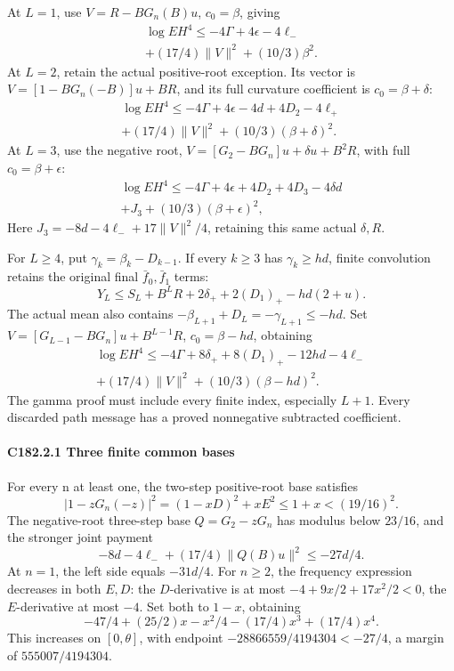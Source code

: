 At \(L=1\), use \(V=R-BG_n(B)u\), \(c_0=\beta\), giving
\[
\begin{gathered}
\log EH^4\le-4\Gamma+4\epsilon-4\ell_-\\
+(17/4)\|V\|^2+(10/3)\beta^2.
\end{gathered}\tag{C182.15}\label{eq:five-even-multipair:L1}
\]
At \(L=2\), retain the actual positive-root exception. Its vector is \(V=[1-BG_n(-B)]u+BR\), and its full curvature coefficient is \(c_0=\beta+\delta\):
\[
\begin{gathered}
\log EH^4\le-4\Gamma+4\epsilon-4d+4D_2-4\ell_+\\
+(17/4)\|V\|^2+(10/3)(\beta+\delta)^2.
\end{gathered}\tag{C182.16}\label{eq:five-even-multipair:L2}
\]
At \(L=3\), use the negative root, \(V=[G_2-BG_n]u+\delta u+B^2R\), with full \(c_0=\beta+\epsilon\):
\[
\begin{gathered}
\log EH^4\le-4\Gamma+4\epsilon+4D_2+4D_3-4\delta d\\
+J_3+(10/3)(\beta+\epsilon)^2,
\end{gathered}\tag{C182.17}\label{eq:five-even-multipair:L3}
\]
Here \(J_3=-8d-4\ell_-+17\|V\|^2/4\), retaining this same actual \(\delta,\allowbreak \allowbreak  R\).

For \(L\ge4\), put \(\gamma_k=\beta_k-D_{k-1}\). If every \(k\ge3\) has \(\gamma_k\ge hd\), finite convolution retains the original final \(\bar f_0,\allowbreak \allowbreak  \bar f_1\) terms:
\[
 Y_L\le S_L+B^LR+2\delta_++2(D_1)_+-hd(2+u).
\]
The actual mean also contains \(-\beta_{L+1}+D_L=-\gamma_{L+1}\le-hd\). Set \(V=[G_{L-1}-BG_n]u+B^{L-1}R\), \(c_0=\beta-hd\), obtaining
\[
\begin{gathered}
\log EH^4\le-4\Gamma+8\delta_++8(D_1)_+-12hd-4\ell_-\\
+(17/4)\|V\|^2+(10/3)(\beta-hd)^2.
\end{gathered}\tag{C182.18}\label{eq:five-even-multipair:Lge4}
\]
The gamma proof must include every finite index, especially \(L+1\). Every discarded path message has a proved nonnegative subtracted coefficient.

\paragraph{C182.2.1 Three finite common bases}

For every n at least one, the two-step positive-root base satisfies
\[
 |1-zG_n(-z)|^2=(1-xD)^2+xE^2\le1+x<(19/16)^2.      \tag{C182.19}
\]
The negative-root three-step base \(Q=G_2-zG_n\) has modulus below \(23/16\), and the stronger joint payment
\[
 -8d-4\ell_-+(17/4)\|Q(B)u\|^2\le-27d/4.         \tag{C182.20}
\]
At \(n=1\), the left side equals \(-31d/4\). For \(n\ge2\), the frequency expression decreases in both \(E,\allowbreak \allowbreak  D\): the \(D\)-derivative is at most \(-4+9x/2+17x^2/2<0\), the \(E\)-derivative at most \(-4\). Set both to \(1-x\), obtaining
\[
 -47/4+(25/2)x-x^2/4-(17/4)x^3+(17/4)x^4.
\]
This increases on \([0,\allowbreak \allowbreak  \theta]\), with endpoint \(-28866559/4194304<-27/4\), a margin of \(555007/4194304\).

